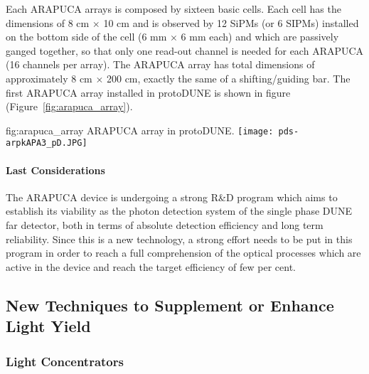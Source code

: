 Each ARAPUCA arrays is composed by sixteen basic cells. Each cell has the dimensions of 8 cm $\times$ 10 cm and is 
observed by 12 SiPMs (or 6 SIPMs) installed on the bottom side of the cell (6 mm $\times$ 6 mm each) and which are passively ganged together, so that only one read-out channel is needed for each 
ARAPUCA (16 channels per array). The ARAPUCA array has total dimensions of approximately 8 cm $\times$ 200 cm, exactly the same of a shifting/guiding bar. The first ARAPUCA array installed in protoDUNE is shown in figure (Figure~\ref{fig:arapuca_array}).

\begin{dunefigure}{fig:arapuca_array}
{ARAPUCA array in protoDUNE.} 	
\texttt{[image: pds-arpkAPA3\_pD.JPG]} 
\end{dunefigure}

\paragraph*{Last Considerations}

The ARAPUCA device is undergoing a strong R\&D program which aims to establish its 
viability as the photon detection system of the single phase DUNE far detector, both 
in terms of absolute detection efficiency and long term reliability. Since this is a 
new technology, a strong effort needs to be put in this program in order to reach a 
full comprehension of the optical processes which are active in the device and reach 
the target efficiency of few per cent.



\subsection{New Techniques to Supplement or Enhance Light Yield}
\label{sec:fdsp-pd-enh}

\subsubsection{Light Concentrators}
\label{sec:fdsp-pd-assy-lc}
	
